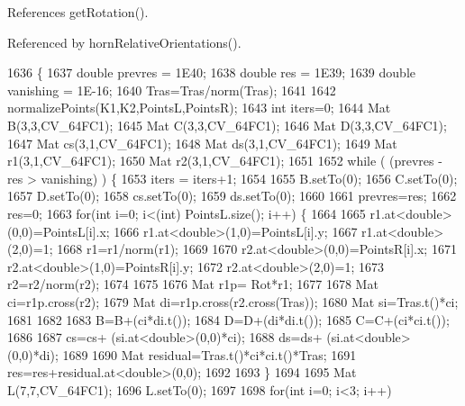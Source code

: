 References get\+Rotation().



Referenced by horn\+Relative\+Orientations().


\begin{DoxyCode}
1636                                                                                                            
              \{
1637     \textcolor{keywordtype}{double} prevres = 1E40;
1638     \textcolor{keywordtype}{double} res = 1E39;
1639     \textcolor{keywordtype}{double} vanishing = 1E-16;
1640     Tras=Tras/norm(Tras);
1641 
1642     normalizePoints(K1,K2,PointsL,PointsR);
1643     \textcolor{keywordtype}{int} iters=0;
1644     Mat B(3,3,CV\_64FC1);
1645     Mat C(3,3,CV\_64FC1);
1646     Mat D(3,3,CV\_64FC1);
1647     Mat cs(3,1,CV\_64FC1);
1648     Mat ds(3,1,CV\_64FC1);
1649     Mat r1(3,1,CV\_64FC1);
1650     Mat r2(3,1,CV\_64FC1);
1651 
1652     \textcolor{keywordflow}{while} ( (prevres  - res  >  vanishing) ) \{
1653         iters = iters+1;
1654         
1655         B.setTo(0);
1656         C.setTo(0);
1657         D.setTo(0);
1658         cs.setTo(0);
1659         ds.setTo(0);
1660        
1661         prevres=res;
1662         res=0;
1663         \textcolor{keywordflow}{for}(\textcolor{keywordtype}{int} i=0; i<(int) PointsL.size(); i++) \{
1664             
1665             r1.at<\textcolor{keywordtype}{double}>(0,0)=PointsL[i].x;
1666             r1.at<\textcolor{keywordtype}{double}>(1,0)=PointsL[i].y;
1667             r1.at<\textcolor{keywordtype}{double}>(2,0)=1;
1668             r1=r1/norm(r1);
1669 
1670             r2.at<\textcolor{keywordtype}{double}>(0,0)=PointsR[i].x;
1671             r2.at<\textcolor{keywordtype}{double}>(1,0)=PointsR[i].y;
1672             r2.at<\textcolor{keywordtype}{double}>(2,0)=1;
1673             r2=r2/norm(r2);
1674 
1675 
1676             Mat r1p= Rot*r1;
1677 
1678             Mat ci=r1p.cross(r2);
1679             Mat di=r1p.cross(r2.cross(Tras));
1680             Mat si=Tras.t()*ci;
1681 
1682           
1683             B=B+(ci*di.t());
1684             D=D+(di*di.t());
1685             C=C+(ci*ci.t());
1686             
1687             cs=cs+ (si.at<\textcolor{keywordtype}{double}>(0,0)*ci);
1688             ds=ds+ (si.at<\textcolor{keywordtype}{double}>(0,0)*di);
1689 
1690             Mat residual=Tras.t()*ci*ci.t()*Tras;
1691             res=res+residual.at<\textcolor{keywordtype}{double}>(0,0);
1692 
1693         \}
1694 
1695         Mat L(7,7,CV\_64FC1);
1696         L.setTo(0);
1697         
1698         \textcolor{keywordflow}{for}(\textcolor{keywordtype}{int} i=0; i<3; i++)

\end{DoxyCode}
